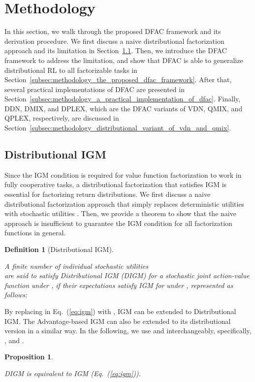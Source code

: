 \documentclass[twoside,11pt]{article}
\newcommand{\ddn}{DDN}
\newcommand{\dmix}{DMIX}
\newcommand{\dplex}{DPLEX}
\newcommand{\digm}{DIGM}
\newcounter{theorem0}
\newcounter{proposition0}
\newcounter{definition0}
\newtheorem{proposition}[proposition0]{Proposition}
\newtheorem{definition}[definition0]{Definition}
\begin{document}
 \section{Methodology}
\label{sec:methodology}

In this section, we walk through the proposed DFAC framework and its derivation procedure. We first discuss a naive distributional factorization approach and its limitation in Section~\ref{subsec:methodology_distributional_igm_condition}.
Then, we introduce the DFAC framework to address the limitation, and show that DFAC is able to generalize distributional RL to all factorizable tasks in Section~\ref{subsec:methodology_the_proposed_dfac_framework}.
After that, several practical implementations of DFAC are presented in Section~\ref{subsec:methodology_a_practical_implementation_of_dfac}.
Finally, \ddn{}, \dmix{}, and \dplex{}, which are the DFAC variants of VDN, QMIX, and QPLEX, respectively, are discussed in Section~\ref{subsec:methodology_distributional_variant_of_vdn_and_qmix}.



\subsection{Distributional IGM}
\label{subsec:methodology_distributional_igm_condition}

Since the IGM condition is required for value function factorization to  work in fully cooperative tasks, a distributional factorization that satisfies IGM is essential for factorizing return distributions. We first discuss a naive distributional factorization approach that simply replaces deterministic utilities  with stochastic utilities . Then, we provide a theorem to show that the naive approach is insufficient to guarantee the IGM condition for all factorization functions in general.
\begin{definition}[Distributional IGM]
\label{def:distributional_igm}

A finite number of individual stochastic utilities\\  are said to satisfy Distributional IGM (\digm{}) for a stochastic joint action-value function  under , if their expectations  satisfy IGM for  under , represented as follows:

\end{definition} By replacing  in Eq.~(\ref{eq:igm}) with , IGM can be extended to Distributional IGM. The Advantage-based IGM can also be extended to its distributional version in a similar way. In the following, we use  and  interchangeably, specifically, , and .
\begin{proposition}
\label{prop:digm_equals_igm}

\digm{} is equivalent to IGM (Eq.~(\ref{eq:igm})).
\end{proposition}
\end{document}
